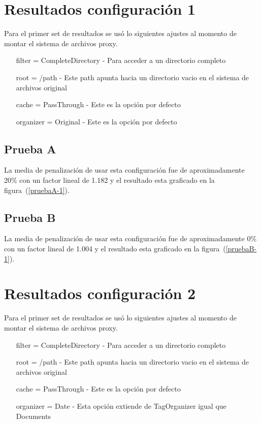 \section{Resultados configuración 1}

Para el primer set de resultados se usó lo siguientes ajustes al momento de montar el sistema de archivos proxy.

\begin{itemize}
\item[filter] = CompleteDirectory - Para acceder a un directorio completo
\item[root] = /path - Este path apunta hacia un directorio vacio en el sistema de archivos original
\item[cache] = PassThrough - Este es la opción por defecto
\item[organizer] = Original - Este es la opción por defecto
\end{itemize}

\subsection{Prueba A}

La media de penalización de usar esta configuración fue de aproximadamente 20\% con un factor lineal de 1.182 y el resultado esta graficado en la figura~(\ref{pruebaA-1}).


\subsection{Prueba B}

La media de penalización de usar esta configuración fue de aproximadamente 0\% con un factor lineal de 1.004 y el resultado esta graficado en la figura~(\ref{pruebaB-1}).



\section{Resultados configuración 2}

Para el primer set de resultados se usó lo siguientes ajustes al momento de montar el sistema de archivos proxy.

\begin{itemize}
\item[filter] = CompleteDirectory - Para acceder a un directorio completo
\item[root] = /path - Este path apunta hacia un directorio vacio en el sistema de archivos original
\item[cache] = PassThrough - Este es la opción por defecto
\item[organizer] = Date - Esta opción extiende de TagOrganizer igual que Documents
\end{itemize}

